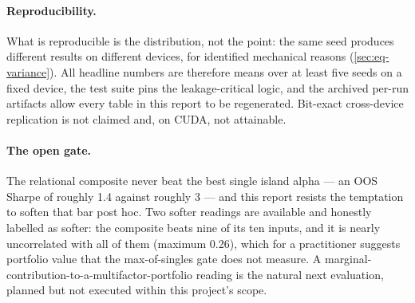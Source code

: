 \paragraph{Reproducibility.} What is reproducible is the distribution,
not the point: the same seed produces different results on different
devices, for identified mechanical reasons (\cref{sec:eq-variance}).
All headline numbers are therefore means over at least five seeds on a
fixed device, the test suite pins the leakage-critical logic, and the
archived per-run artifacts allow every table in this report to be
regenerated. Bit-exact cross-device replication is not claimed and, on
CUDA, not attainable.

\paragraph{The open gate.} The relational composite never beat the best
single island alpha --- an OOS Sharpe of roughly 1.4 against roughly 3
--- and this report resists the temptation to soften that bar
post hoc. Two softer readings are available and honestly labelled as
softer: the composite beats nine of its ten inputs, and it is nearly
uncorrelated with all of them (maximum 0.26), which for a practitioner
suggests portfolio value that the max-of-singles gate does not measure.
A marginal-contribution-to-a-multifactor-portfolio reading is the
natural next evaluation, planned but not executed within this project's
scope.

